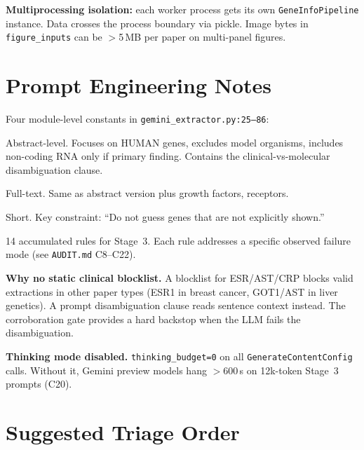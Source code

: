 \documentclass[11pt,a4paper]{article}
\newcommand{\codefile}[1]{\texttt{\small\color{gray}#1}}
\begin{document}
\textbf{Multiprocessing isolation:} each worker process gets its own \texttt{GeneInfoPipeline} instance. Data crosses the process boundary via pickle. Image bytes in \texttt{figure\_inputs} can be $>$5\,MB per paper on multi-panel figures.

\section{Prompt Engineering Notes}

Four module-level constants in \codefile{gemini\_extractor.py:25--86}:

\begin{description}[leftmargin=2em]
\item[\texttt{\_GENE\_DISCOVERY\_INSTRUCTION\_ABSTRACT}] Abstract-level. Focuses on HUMAN genes, excludes model organisms, includes non-coding RNA only if primary finding. Contains the clinical-vs-molecular disambiguation clause.
\item[\texttt{\_GENE\_DISCOVERY\_INSTRUCTION\_FULLTEXT}] Full-text. Same as abstract version plus growth factors, receptors.
\item[\texttt{\_FIGURE\_ANALYSIS\_INSTRUCTION}] Short. Key constraint: ``Do not guess genes that are not explicitly shown.''
\item[\texttt{\_DETAIL\_EXTRACTION\_CRITICAL\_INSTRUCTIONS}] 14 accumulated rules for Stage~3. Each rule addresses a specific observed failure mode (see \texttt{AUDIT.md} C8--C22).
\end{description}

\textbf{Why no static clinical blocklist.} A blocklist for ESR/AST/CRP blocks valid extractions in other paper types (ESR1 in breast cancer, GOT1/AST in liver genetics). A prompt disambiguation clause reads sentence context instead. The corroboration gate provides a hard backstop when the LLM fails the disambiguation.

\textbf{Thinking mode disabled.} \texttt{thinking\_budget=0} on all \texttt{GenerateContentConfig} calls. Without it, Gemini preview models hang $>$600\,s on 12k-token Stage~3 prompts (C20).

\section{Suggested Triage Order}
\end{document}
